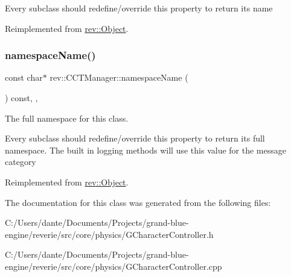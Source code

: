 Every subclass should redefine/override this property to return its name 

Reimplemented from \mbox{\hyperlink{classrev_1_1_object_a7a2013f91169479b65cf93afdc5d9a68}{rev\+::\+Object}}.

\mbox{\label{classrev_1_1_c_c_t_manager_af40188f0c27823159bf272a0d867892b}} 
\subsubsection{\texorpdfstring{namespaceName()}{namespaceName()}}
{\footnotesize\ttfamily const char$\ast$ rev\+::\+C\+C\+T\+Manager\+::namespace\+Name (\begin{DoxyParamCaption}{ }\end{DoxyParamCaption}) const\hspace{0.3cm}{\ttfamily [inline]}, {\ttfamily [override]}, {\ttfamily [virtual]}}



The full namespace for this class. 

Every subclass should redefine/override this property to return its full namespace. The built in logging methods will use this value for the message category 

Reimplemented from \mbox{\hyperlink{classrev_1_1_object_aaeb638d3e10f361c56c211a318a27f3d}{rev\+::\+Object}}.



The documentation for this class was generated from the following files\+:\begin{DoxyCompactItemize}
\item 
C\+:/\+Users/dante/\+Documents/\+Projects/grand-\/blue-\/engine/reverie/src/core/physics/G\+Character\+Controller.\+h\item 
C\+:/\+Users/dante/\+Documents/\+Projects/grand-\/blue-\/engine/reverie/src/core/physics/G\+Character\+Controller.\+cpp\end{DoxyCompactItemize}
